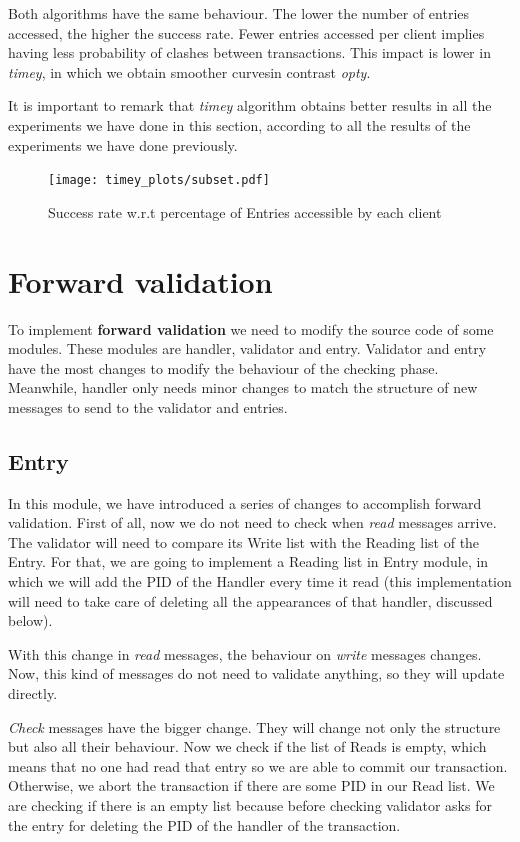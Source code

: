 \documentclass[a4paper, 10pt]{article}
\begin{document}
Both algorithms have the same behaviour. The lower the number of entries accessed, the higher the success rate. Fewer entries accessed per client implies having less probability of clashes between transactions. This impact is lower in \textit{timey}, in which we obtain smoother curvesin contrast \textit{opty}.

It is important to remark that \textit{timey} algorithm obtains better results in all the experiments we have done in this section, according to all the results of the experiments we have done previously.

\begin{figure}[H]
  \centering
  \texttt{[image: timey\_plots/subset.pdf]}
    \caption{Success rate w.r.t percentage of Entries accessible by each client}
    \label{timey:subset}
\end{figure} 

\clearpage


\section{Forward validation}

To implement \textbf{forward validation} we need to modify the source code of some modules. These modules are handler, validator and entry. Validator and entry have the most changes to modify the behaviour of the checking phase. Meanwhile, handler only needs minor changes to match the structure of new messages to send to the validator and entries.

\subsection{Entry}

In this module, we have introduced a series of changes to accomplish forward validation. First of all, now we do not need to check when \textit{read} messages arrive. The validator will need to compare its Write list with the Reading list of the Entry. For that, we are going to implement a Reading list in Entry module, in which we will add the PID of the Handler every time it read (this implementation will need to take care of deleting all the appearances of that handler, discussed below).

With this change in \textit{read} messages, the behaviour on \textit{write} messages changes. Now, this kind of messages do not need to validate anything, so they will update directly.

\textit{Check} messages have the bigger change. They will change not only the structure but also all their behaviour. Now we check if the list of Reads is empty, which means that no one had read that entry so we are able to commit our transaction. Otherwise, we abort the transaction if there are some PID in our Read list. We are checking if there is an empty list because before checking validator asks for the entry for deleting the PID of the handler of the transaction.
\end{document}
